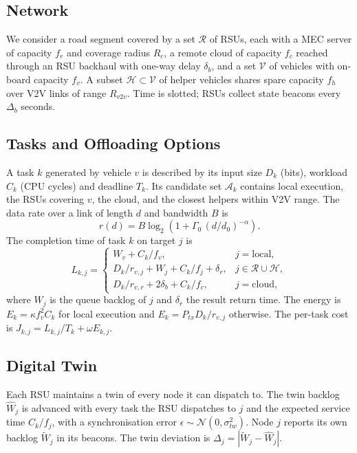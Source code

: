 \documentclass[journal]{IEEEtran}
\begin{document}
\subsection{Network}
We consider a road segment covered by a set $\mathcal{R}$ of RSUs, each with a MEC server of capacity $f_r$ and coverage radius $R_c$, a remote cloud of capacity $f_c$ reached through an RSU backhaul with one-way delay $\delta_b$, and a set $\mathcal{V}$ of vehicles with on-board capacity $f_v$. A subset $\mathcal{H}\subset\mathcal{V}$ of helper vehicles shares spare capacity $f_h$ over V2V links of range $R_{v2v}$. Time is slotted; RSUs collect state beacons every $\Delta_b$ seconds.

\subsection{Tasks and Offloading Options}
A task $k$ generated by vehicle $v$ is described by its input size $D_k$ (bits), workload $C_k$ (CPU cycles) and deadline $T_k$. Its candidate set $\mathcal{A}_k$ contains local execution, the RSUs covering $v$, the cloud, and the closest helpers within V2V range. The data rate over a link of length $d$ and bandwidth $B$ is
\begin{equation}
r(d) = B\log_2\!\left(1+\Gamma_0\,(d/d_0)^{-\alpha}\right).
\end{equation}
The completion time of task $k$ on target $j$ is
\begin{equation}
L_{k,j} =
\begin{cases}
W_v + C_k/f_v, & j=\text{local},\\
D_k/r_{v,j} + W_j + C_k/f_j + \delta_r, & j\in\mathcal{R}\cup\mathcal{H},\\
D_k/r_{v,r} + 2\delta_b + C_k/f_c, & j=\text{cloud},
\end{cases}
\end{equation}
where $W_j$ is the queue backlog of $j$ and $\delta_r$ the result return time. The energy is $E_{k}=\kappa f_v^2 C_k$ for local execution and $E_k = P_{tx} D_k / r_{v,j}$ otherwise. The per-task cost is $J_{k,j} = L_{k,j}/T_k + \omega E_{k,j}$.

\subsection{Digital Twin}
Each RSU maintains a twin of every node it can dispatch to. The twin backlog $\hat{W}_j$ is advanced with every task the RSU dispatches to $j$ and the expected service time $C_k/f_j$, with a synchronisation error $\epsilon\sim\mathcal{N}(0,\sigma_{tw}^2)$. Node $j$ reports its own backlog $\tilde{W}_j$ in its beacons. The twin deviation is $\Delta_j = |\tilde{W}_j - \hat{W}_j|$.
\end{document}

